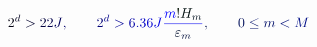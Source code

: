\documentclass[12pt]{article}
\begin{document}
\makeatletter
\renewcommand*{\@textcolor}[3]{%
  \protect\leavevmode
  \begingroup
    \color#1{#2}#3%
  \endgroup
}
\makeatother
\begin{displaymath}
\mathcolor[RGB]{0,0,15}{2} ^ { \mathcolor[RGB]{0,0,30}{d} } \mathcolor[RGB]{0,0,45}{>} \mathcolor[RGB]{0,0,60}{2} \mathcolor[RGB]{0,0,75}{2} \mathcolor[RGB]{0,0,90}{J} \mathcolor[RGB]{0,0,105}{,} \qquad \mathcolor[RGB]{0,0,120}{2} ^ { \mathcolor[RGB]{0,0,135}{d} } \mathcolor[RGB]{0,0,150}{>} \mathcolor[RGB]{0,0,165}{6} \mathcolor[RGB]{0,0,180}{.} \mathcolor[RGB]{0,0,195}{3} \mathcolor[RGB]{0,0,210}{6} \mathcolor[RGB]{0,0,225}{J} \mathcolor[RGB]{0,0,240}{\frac { \mathcolor[RGB]{0,0,255}{m} \mathcolor[RGB]{0,15,0}{!} \mathcolor[RGB]{0,15,15}{H} _ { \mathcolor[RGB]{0,15,30}{m} } } { \mathcolor[RGB]{0,15,45}{\varepsilon} _ { \mathcolor[RGB]{0,15,60}{m} } } } \mathcolor[RGB]{0,15,75}{,} \qquad \mathcolor[RGB]{0,15,90}{0} \mathcolor[RGB]{0,15,105}{\le
m} \mathcolor[RGB]{0,15,120}{<} \mathcolor[RGB]{0,15,135}{M}
\end{displaymath}
\end{document}

